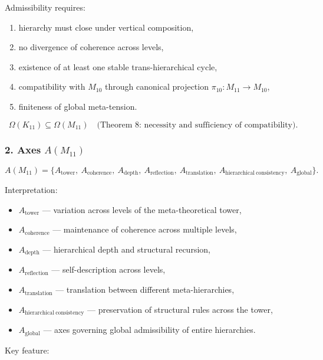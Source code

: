 Admissibility requires:

\begin{enumerate}
    \item hierarchy must close under vertical composition,
    \item no divergence of coherence across levels,
    \item existence of at least one stable trans-hierarchical cycle,
    \item compatibility with $M_{10}$ through canonical projection 
          $\pi_{10}:M_{11}\to M_{10}$,
    \item finiteness of global meta-tension.
\end{enumerate}

\[
\Omega(K_{11}) \subseteq \Omega(M_{11}) 
\quad\text{(Theorem 8: necessity and sufficiency of compatibility)}.
\]

\subsubsection*{2. Axes $A(M_{11})$}

\[
A(M_{11}) =
\{
A_{\mathrm{tower}},\
A_{\mathrm{coherence}},\
A_{\mathrm{depth}},\
A_{\mathrm{reflection}},\
A_{\mathrm{translation}},\
A_{\mathrm{hierarchical\ consistency}},\
A_{\mathrm{global}}
\}.
\]

Interpretation:

\begin{itemize}
    \item $A_{\mathrm{tower}}$ — variation across levels of the meta-theoretical tower,
    \item $A_{\mathrm{coherence}}$ — maintenance of coherence across multiple levels,
    \item $A_{\mathrm{depth}}$ — hierarchical depth and structural recursion,
    \item $A_{\mathrm{reflection}}$ — self-description across levels,
    \item $A_{\mathrm{translation}}$ — translation between different meta-hierarchies,
    \item $A_{\mathrm{hierarchical\ consistency}}$ — preservation of structural rules across the tower,
    \item $A_{\mathrm{global}}$ — axes governing global admissibility of entire hierarchies.
\end{itemize}

Key feature:

